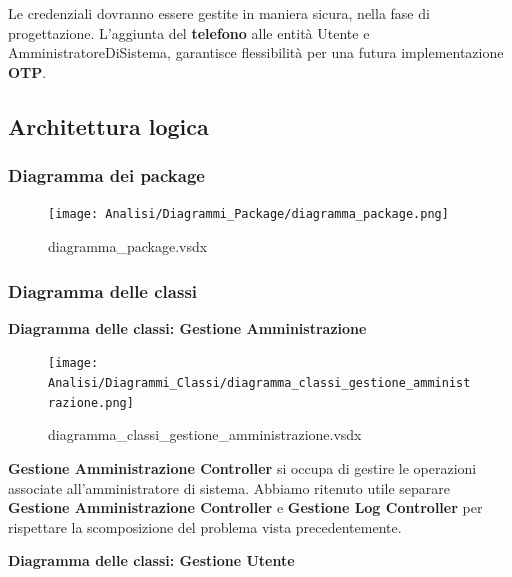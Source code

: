 \documentclass[a4paper]{article}
\begin{document}
Le credenziali dovranno essere gestite in maniera sicura, nella fase di progettazione. L'aggiunta del \textbf{telefono} alle entità Utente e AmministratoreDiSistema, garantisce flessibilità per una futura implementazione \textbf{OTP}.

\newpage

\subsection{Architettura logica}

\subsubsection{Diagramma dei package}


\begin{figure}[H]
    \texttt{[image: Analisi/Diagrammi\_Package/diagramma\_package.png]}
    \centering
    \caption{diagramma\_package.vsdx}
\end{figure}


\newpage

\subsubsection{Diagramma delle classi}

\textbf{Diagramma delle classi: Gestione Amministrazione}

\begin{figure}[H]
    \texttt{[image: Analisi/Diagrammi\_Classi/diagramma\_classi\_gestione\_amministrazione.png]}
    \centering
    \caption{diagramma\_classi\_gestione\_amministrazione.vsdx}
\end{figure}

\textbf{Gestione Amministrazione Controller} si occupa di gestire le operazioni associate all'amministratore di sistema. Abbiamo ritenuto utile separare \textbf{Gestione Amministrazione Controller} e \textbf{Gestione Log Controller} per rispettare la scomposizione del problema vista precedentemente.

\newpage

\textbf{Diagramma delle classi: Gestione Utente}
\end{document}
